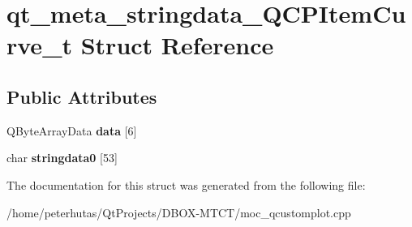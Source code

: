 \hypertarget{structqt__meta__stringdata___q_c_p_item_curve__t}{}\section{qt\+\_\+meta\+\_\+stringdata\+\_\+\+Q\+C\+P\+Item\+Curve\+\_\+t Struct Reference}
\label{structqt__meta__stringdata___q_c_p_item_curve__t}
\subsection*{Public Attributes}
\begin{DoxyCompactItemize}
\item 
\mbox{\label{structqt__meta__stringdata___q_c_p_item_curve__t_ac6d43f09ee6cd9ad95da06d7fd942e8f}} 
Q\+Byte\+Array\+Data {\bfseries data} \mbox{[}6\mbox{]}
\item 
\mbox{\label{structqt__meta__stringdata___q_c_p_item_curve__t_a52ddb589fe5c4e7eba75b1eb50799729}} 
char {\bfseries stringdata0} \mbox{[}53\mbox{]}
\end{DoxyCompactItemize}


The documentation for this struct was generated from the following file\+:\begin{DoxyCompactItemize}
\item 
/home/peterhutas/\+Qt\+Projects/\+D\+B\+O\+X-\/\+M\+T\+C\+T/moc\+\_\+qcustomplot.\+cpp\end{DoxyCompactItemize}

